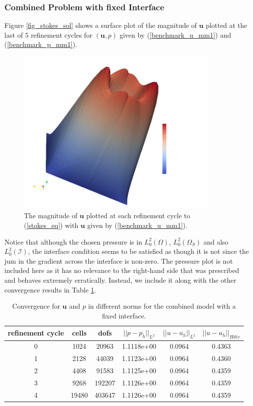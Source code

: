 \documentclass[12pt,a4paper]{article}
\theoremstyle{definition}
\begin{document}
\subsubsection{Combined Problem with fixed Interface}
Figure \ref{fig_stokes_sol}  shows a surface plot of the magnitude of $\textbf{u}$ plotted at the last of $5$ refinement cycles for $\left(\textbf{u}, p\right)$ given by (\ref{benchmark_u_mm1}) and (\ref{benchmark_p_mm1}).
\begin{figure}[H]
	\centering
	\includegraphics[width=10cm]{combi_u}
	\caption{The magnitude of $\textbf{u}$ plotted at each refinement cycle to (\ref{stokes_eq}) with $\textbf{u}$ given by (\ref{benchmark_u_mm1}).}
	\label{fig_combi_sol}
\end{figure}
Notice that although the chosen pressure is in  $L^2_0\left(\Omega\right)$, $L^2_0\left(\Omega_S\right)$ and also $L^2_0\left(\mathcal{I}\right)$, the interface condition seems to be satisfied as though it is not since the jum in the gradient across the interface is non-zero.  The pressure plot is not included here as it has no relevance to the right-hand side that was prescribed and behaves extremely erratically.  Instead, we include it along with the other convergence results in Table \ref{tablebenchmark_convergence_mm1}.  
\begin{table}[H]
	\begin{center}
	\begin{tabular}{|c|c|c|c|c|c|} \hline
		refinement cycle & cells & dofs & $||p-p_h||_{L^2}$ & $||u-u_h||_{L^2}$ & $||u-u_h||_{Hdiv}$\\ \hline
		0 & 1024 & 20963 & 1.1118e+00 & 0.0964 & 0.4363\\ \hline
		1 & 2128 & 44039 & 1.1123e+00 & 0.0964 & 0.4360\\ \hline
		2 & 4408 & 91583 & 1.1125e+00 & 0.0964 & 0.4359\\ \hline
		3 & 9268 & 192207 & 1.1126e+00 & 0.0964 & 0.4359\\ \hline
		4 & 19480 & 403647 & 1.1126e+00 & 0.0964 & 0.4359\\ \hline
	\end{tabular}
		\caption{Convergence for $\textbf{u}$ and $p$ in different norms for the combined model with a fixed interface.}
		\label{tablebenchmark_convergence_mm1}
	\end{center}
\end{table}
\end{document}
